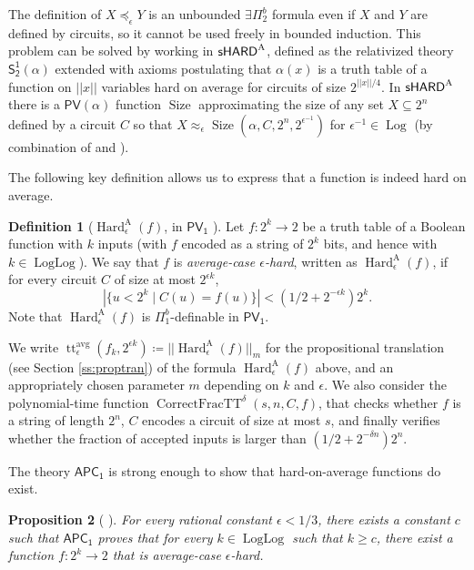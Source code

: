 \documentclass[11pt]{article}
\newcommand{\SOT}{\mathsf{S^1_2}}
\renewcommand{\PV}{\mathsf{PV}}
\newcommand{\PVO}{\mathsf{PV_1}}
\newcommand{\APC}{\mathsf{APC_1}}
\newcommand{\setsize}{\operatorname{Size}}
\def\tt{\operatorname{CorrectFracTT}}
\theoremstyle{definition}
\newtheorem{definition}{Definition}[section]
\theoremstyle{plain}
\newtheorem{proposition}[definition]{Proposition}
\theoremstyle{remark}
\newcommand{\Log}{\operatorname{Log}}
\newcommand{\LogLog}{\operatorname{LogLog}}
\begin{document}
The definition of $X\preceq_{\epsilon} Y$ is an unbounded $\exists \Pi^b_2$ formula even if $X$ and $Y$ are defined by circuits, so it cannot be used freely in bounded induction. This problem can be solved by working in ${\sf sHARD}^{\text{A}}$, defined as the relativized theory $\SOT(\alpha)$ extended with axioms postulating that $\alpha(x)$ is a truth table of a function on $||x||$ variables hard on average for circuits of size $2^{||x||/4}$. In ${\sf sHARD}^{\text{A}}$ there is a $\PV(\alpha)$ function $\setsize$ approximating the size of any set $X\subseteq 2^n$ defined by a circuit $C$ so that $X\approx_{\epsilon} \setsize(\alpha, C,2^n,2^{\epsilon^{-1}})$ for $\epsilon^{-1}\in \Log$ (by combination of \cite[Lemma 2.14]{Jer07} and \cite[Cor. 3.6]{Jer04-Dual}).

The following key definition allows us to express that a function is indeed hard on average.

\begin{definition}[$\operatorname{Hard}^\text{A}_{\epsilon}(f)$, in $\PVO$ \cite{Jer07}] Let $f:2^k\rightarrow 2$ be a truth table of a Boolean function with $k$ inputs (with $f$ encoded as a string of $2^k$ bits, and hence with $k\in \LogLog$). We say that $f$ is \emph{average-case $\epsilon$-hard}, written as $\operatorname{Hard}^\text{A}_{\epsilon}(f)$, if for every circuit $C$ of size at most $2^{\epsilon k}$, $$|\{u<2^k\mid C(u)=f(u)\}| < (1/2+2^{-\epsilon k})2^k.$$
Note that $\operatorname{Hard}^\text{A}_{\epsilon}(f)$ is $\Pi_1^b$-definable in $\PVO$.
\end{definition}

We write $\operatorname{tt}^{\text{avg}}_\epsilon (f_k, 2^{\epsilon k}) \coloneqq || \operatorname{Hard}^\text{A}_{\epsilon}(f) ||_m$ for the propositional translation (see Section \ref{ss:proptran}) of the formula $\operatorname{Hard}^\text{A}_{\epsilon}(f)$ above, and an appropriately chosen parameter $m$ depending on $k$ and $\epsilon$.
We also consider the polynomial-time function $\tt^{\delta}(s, n, C, f)$, that checks whether $f$ is a string of length $2^n$, $C$ encodes a circuit of size at most $s$, and finally verifies whether the fraction of accepted inputs is larger than $(1/2 + 2^{-\delta n})2^n$.

The theory $\APC$ is strong enough to show that hard-on-average functions do exist.

\begin{proposition}[\citeauthor{Jer07} \cite{Jer04-Dual}] For every rational constant $\epsilon <1/3$, there exists a constant $c$ such that $\APC$ proves that for every $k\in \LogLog$ such that $k\geq c$, there exist a function $f:2^k\rightarrow 2$ that is average-case $\epsilon$-hard. \end{proposition}
\end{document}
